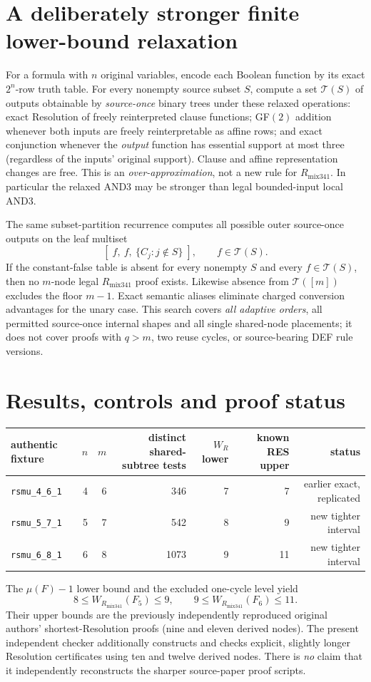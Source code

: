 \documentclass[11pt]{article}
\begin{document}
\section*{A deliberately stronger finite lower-bound relaxation}
For a formula with $n$ original variables, encode each Boolean function by its exact $2^n$-row truth table. For every nonempty source subset $S$, compute a set $\mathcal T(S)$ of outputs obtainable by \emph{source-once} binary trees under these relaxed operations: exact Resolution of freely reinterpreted clause functions; GF$(2)$ addition whenever both inputs are freely reinterpretable as affine rows; and exact conjunction whenever the \emph{output} function has essential support at most three (regardless of the inputs' original support). Clause and affine representation changes are free. This is an \emph{over-approximation}, not a new rule for $R_{\mathrm{mix341}}$. In particular the relaxed AND3 may be stronger than legal bounded-input local AND3.

The same subset-partition recurrence computes all possible outer source-once outputs on the leaf multiset
\[
[\;f,\ f,\ \{C_j:j\notin S\}\;],\qquad f\in\mathcal T(S).
\]
If the constant-false table is absent for every nonempty $S$ and every $f\in\mathcal T(S)$, then no $m$-node legal $R_{\mathrm{mix341}}$ proof exists. Likewise absence from $\mathcal T([m])$ excludes the floor $m-1$. Exact semantic aliases eliminate charged conversion advantages for the unary case. This search covers \emph{all adaptive orders}, all permitted source-once internal shapes and all single shared-node placements; it does not cover proofs with $q>m$, two reuse cycles, or source-bearing DEF rule versions.

\section*{Results, controls and proof status}
\begin{center}
\begin{tabular}{lrrrrrr}
\toprule
authentic fixture & $n$ & $m$ & distinct shared-subtree tests & $W_R$ lower & known RES upper & status\\
\midrule
\texttt{rsmu\_4\_6\_1} &4&6&346&7&7&earlier exact, replicated\\
\texttt{rsmu\_5\_7\_1} &5&7&542&8&9&new tighter interval\\
\texttt{rsmu\_6\_8\_1} &6&8&1073&9&11&new tighter interval\\
\bottomrule
\end{tabular}
\end{center}
The $\mu(F)-1$ lower bound and the excluded one-cycle level yield
\[
\boxed{8\le W_{R_{\mathrm{mix341}}}(F_5)\le 9},\qquad
\boxed{9\le W_{R_{\mathrm{mix341}}}(F_6)\le11}.
\]
Their upper bounds are the previously independently reproduced original authors' shortest-Resolution proofs (nine and eleven derived nodes). The present independent checker additionally constructs and checks explicit, slightly longer Resolution certificates using ten and twelve derived nodes. There is \emph{no} claim that it independently reconstructs the sharper source-paper proof scripts.
\end{document}
